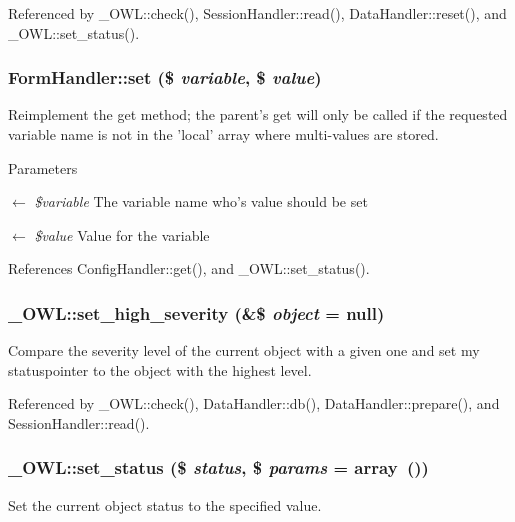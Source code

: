 Referenced by \_\-OWL::check(), SessionHandler::read(), DataHandler::reset(), and \_\-OWL::set\_\-status().

\subsubsection[{set}]{\setlength{\rightskip}{0pt plus 5cm}FormHandler::set (\$ {\em variable}, \/  \$ {\em value})}\label{classFormHandler_a5fcc8aef0de87e31ceee65ad1eadb96c}
Reimplement the get method; the parent's get will only be called if the requested variable name is not in the 'local' array where multi-\/values are stored.


\begin{DoxyParams}{Parameters}
\item[\mbox{$\leftarrow$} {\em \$variable}]The variable name who's value should be set \item[\mbox{$\leftarrow$} {\em \$value}]Value for the variable \end{DoxyParams}


References ConfigHandler::get(), and \_\-OWL::set\_\-status().

\subsubsection[{set\_\-high\_\-severity}]{\setlength{\rightskip}{0pt plus 5cm}\_\-OWL::set\_\-high\_\-severity (\&\$ {\em object} = {\ttfamily null})}\label{class__OWL_a576829692a3b66e3d518853bf43abae3}
Compare the severity level of the current object with a given one and set my statuspointer to the object with the highest level. 

Referenced by \_\-OWL::check(), DataHandler::db(), DataHandler::prepare(), and SessionHandler::read().

\subsubsection[{set\_\-status}]{\setlength{\rightskip}{0pt plus 5cm}\_\-OWL::set\_\-status (\$ {\em status}, \/  \$ {\em params} = {\ttfamily array~()})}\label{class__OWL_aea912d0ede9b3c2a69b79072d94d4787}
Set the current object status to the specified value.


